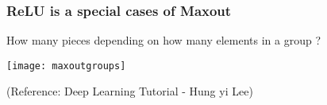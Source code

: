 \begin{frame}[fragile] \frametitle{ReLU is a special cases of Maxout}
How many pieces depending on how many elements in a group ?

\begin{center}
\texttt{[image: maxoutgroups]}
\end{center}
\tiny{(Reference:  Deep Learning Tutorial - Hung yi Lee)}
\end{frame}


